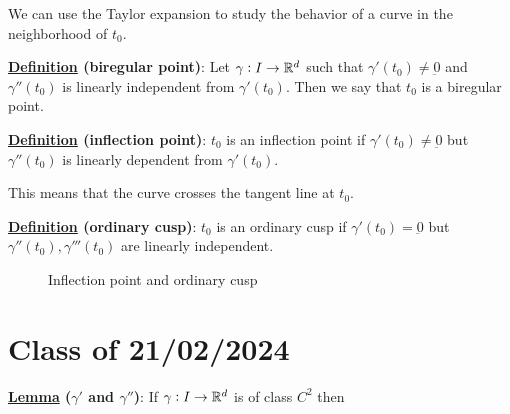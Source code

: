 \documentclass[10pt]{extarticle}
\renewcommand{\vec}[1]{\underbar{\ensuremath{#1}}}
\begin{document}
We can use the Taylor expansion to study the behavior of a curve in the neighborhood of $t_0$.


\textbf{\underline{Definition} (biregular point)}:
Let $\gamma: I \to \mathbb{R}^d$ such that $\gamma'(t_0) \ne \vec{0}$ and $\gamma''(t_0)$ is linearly independent from $\gamma'(t_0)$.
Then we say that $t_0$ is a biregular point.

\textbf{\underline{Definition} (inflection point)}:
$t_0$ is an inflection point if $\gamma'(t_0) \ne \vec{0}$ but $\gamma''(t_0)$ is linearly dependent from $\gamma'(t_0)$.

This means that the curve crosses the tangent line at $t_0$.


\textbf{\underline{Definition} (ordinary cusp)}:
$t_0$ is an ordinary cusp if $\gamma'(t_0) = \vec{0}$ but $\gamma''(t_0), \gamma'''(t_0)$ are linearly independent.

\begin{figure}[H]
    \centering
    \caption{Inflection point and ordinary cusp}
    \label{fig:inflection_point_and_ordinary_cusp}
\end{figure}

\section{Class of 21/02/2024}

\textbf{\underline{Lemma} ($\gamma'$ and $\gamma''$)}:
If $\gamma: I \to \mathbb{R}^d$ is of class $C^2$ then
\end{document}
